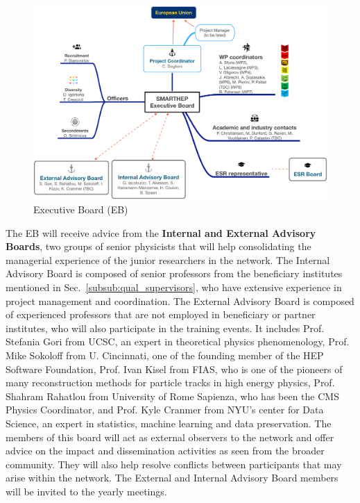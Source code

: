 \begin{figure}
\begin{center}
\includegraphics[width=\textwidth]{figs/SMARTHEP_Boards.png} %
\caption{\acronym Executive Board (EB)}
\label{fig:management}
\end{center}
\vspace{-5mm}
\end{figure}


The EB will receive advice from the \textbf{Internal and External Advisory Boards}, two groups of senior physicists that will help consolidating the managerial experience of the junior researchers in the network. 
The Internal Advisory Board is composed of senior professors from the beneficiary institutes mentioned in Sec.~\ref{subsub:qual_supervisors}, who have extensive experience in project management and coordination. 
The External Advisory Board is composed of experienced professors that are not employed in beneficiary or partner institutes, who will also participate in the training events. 
It includes Prof. Stefania Gori from UCSC, an expert in theoretical physics phenomenology, Prof. Mike Sokoloff from U. Cincinnati, one of the founding member of the HEP Software Foundation, Prof. Ivan Kisel from FIAS, who is one of the pioneers of many reconstruction methods for particle tracks in high energy physics, Prof. Shahram Rahatlou from University of Rome Sapienza, who has been the CMS Physics Coordinator, and Prof. Kyle Cranmer from NYU's center for Data Science, an expert in statistics, machine learning and data preservation. 
The members of this board will act as external observers to the network and offer advice on the impact and dissemination activities as seen from the broader community. 
They will also help resolve conflicts between participants that may arise within the network.
The External and Internal Advisory Board members will be invited to the \acronym yearly meetings. 

